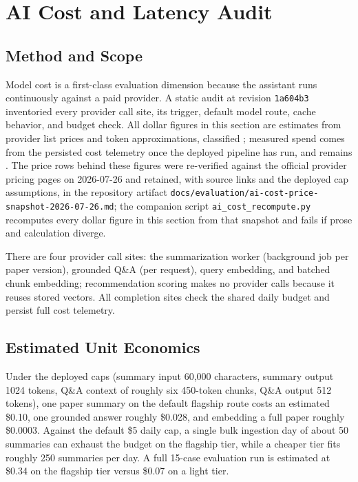 \section{AI Cost and Latency Audit}

\subsection{Method and Scope}

Model cost is a first-class evaluation dimension because the assistant runs continuously against a paid provider.
A static audit at revision \texttt{1a604b3} inventoried every provider call site, its trigger, default model route, cache behavior, and budget check.
All dollar figures in this section are estimates from provider list prices and token approximations, classified \observed{}; measured spend comes from the persisted cost telemetry once the deployed pipeline has run, and remains \pending.
The price rows behind these figures were re-verified against the official provider pricing pages on 2026-07-26 and retained, with source links and the deployed cap assumptions, in the repository artifact \texttt{docs/evaluation/ai-cost-price-snapshot-2026-07-26.md}; the companion script \texttt{ai\_cost\_recompute.py} recomputes every dollar figure in this section from that snapshot and fails if prose and calculation diverge.

There are four provider call sites: the summarization worker (background job per paper version), grounded Q\&A (per request), query embedding, and batched chunk embedding; recommendation scoring makes no provider calls because it reuses stored vectors.
All completion sites check the shared daily budget and persist full cost telemetry.

\subsection{Estimated Unit Economics}

Under the deployed caps (summary input 60{,}000 characters, summary output 1024 tokens, Q\&A context of roughly six 450-token chunks, Q\&A output 512 tokens), one paper summary on the default flagship route costs an estimated \$0.10, one grounded answer roughly \$0.028, and embedding a full paper roughly \$0.0003.
Against the default \$5 daily cap, a single bulk ingestion day of about 50 summaries can exhaust the budget on the flagship tier, while a cheaper tier fits roughly 250 summaries per day.
A full 15-case evaluation run is estimated at \$0.34 on the flagship tier versus \$0.07 on a light tier.

